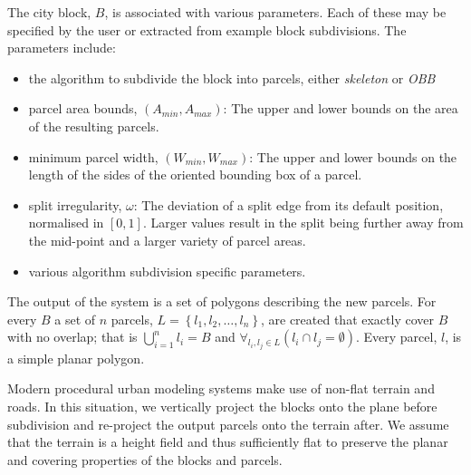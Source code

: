 The city block, $B$, is associated with various parameters. Each of these may be specified by the user or extracted from example block subdivisions. The parameters include:
\begin{itemize}
\item the algorithm to subdivide the block into parcels, either \emph{skeleton} or \emph{OBB}
\item parcel area bounds, $( A_{min},A_{max})$: The upper and lower bounds on the area of the resulting parcels. %
\item minimum parcel width, $(W_{min},W_{max})$: The upper and lower bounds on the length of the sides of the oriented bounding box of a parcel.
\item split irregularity, $\omega$: The deviation of a split edge from its default position, normalised in $\left[ 0,1 \right]$.
Larger values result in the split being further away from the mid-point and a larger variety of parcel areas.
\item various algorithm subdivision specific parameters. 
\end{itemize}

The output of the system is a set of polygons describing the new parcels. For every $B$ a set of $n$ parcels, $L= \left\{ l_1,l_2,\ldots ,l_n \right\}$, are created that exactly cover $B$ with no overlap; that is $\bigcup_{i=1}^n l_i =B$ and $\forall_{l_i,l_j \in L} ( l_i \cap l_j = \emptyset )$. Every parcel, $l$, is a simple planar polygon. 


Modern procedural urban modeling systems make use of non-flat terrain and roads. In this situation, we vertically project the blocks onto the plane before subdivision and re-project the output parcels onto the terrain after. We assume that the terrain is a height field and thus sufficiently flat to preserve the planar and covering properties of the blocks and parcels.


